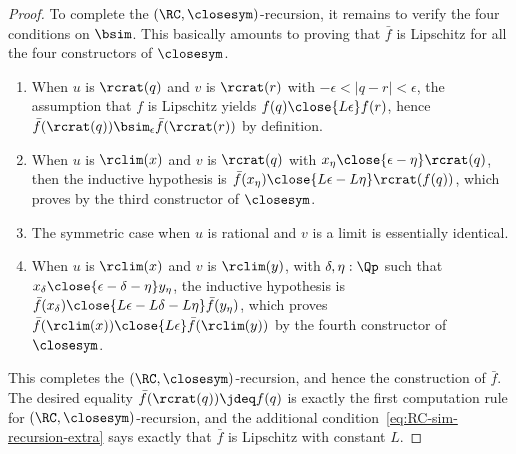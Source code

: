 \begin{proof}
  To complete the $(\RC,\closesym)$-recursion, it remains to verify the four conditions on $\bsim$.
  This basically amounts to proving that $\bar f$ is Lipschitz for all the four constructors of $\closesym$.
  \begin{enumerate}
  \item When $u$ is $\rcrat(q)$ and $v$ is $\rcrat(r)$ with $-\epsilon < |q-r| <\epsilon$, the assumption that $f$ is Lipschitz yields $f(q) \close{L\epsilon} f(r)$, hence $\bar{f}(\rcrat(q)) \bsim_\epsilon \bar{f}(\rcrat(r))$ by definition.
  \item When $u$ is $\rclim(x)$ and $v$ is $\rcrat(q)$ with $x_\eta \close{\epsilon - \eta} \rcrat(q)$, then the
      inductive hypothesis is $\bar{f}(x_\eta) \close{L \epsilon - L \eta} \rcrat(f(q))$, which proves
      by the third constructor of $\closesym$.
  \item The symmetric case when $u$ is rational and $v$ is a limit is essentially identical.
  \item When $u$ is $\rclim(x)$ and $v$ is $\rclim(y)$, with $\delta, \eta : \Qp$ such that $x_\delta \close{\epsilon - \delta - \eta} y_\eta$,
      the inductive hypothesis is $\bar{f}(x_\delta) \close{L \epsilon - L \delta - L \eta} \bar{f}(y_\eta)$, which proves $\bar{f}(\rclim(x)) \close{L
        \epsilon} \bar{f}(\rclim(y))$ by the fourth constructor of $\closesym$.
  \end{enumerate}
  This completes the $(\RC,\closesym)$-recursion, and hence the construction of $\bar f$.
  The desired equality $\bar f(\rcrat(q))\jdeq f(q)$ is exactly the first computation rule for $(\RC,\closesym)$-recursion, and the additional condition~\eqref{eq:RC-sim-recursion-extra} says exactly that $\bar f$ is Lipschitz with constant $L$.
\end{proof}
